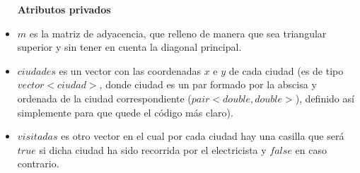 \documentclass[12pt]{article}
\begin{document}
\begin{itemize}
\item[\textbf{Atributos privados}]
\item $m$ es la matriz de adyacencia, que relleno de manera que sea triangular superior y sin tener en cuenta la diagonal principal.
\item $ciudades$ es un vector con las coordenadas $x$ e $y$ de cada ciudad (es de tipo $vector<ciudad>$, donde ciudad es un par formado por la abscisa y ordenada de la ciudad correspondiente ($pair<double, double>$), definido así simplemente para que quede el código más claro).
\item $visitadas$ es otro vector en el cual por cada ciudad hay una casilla que será $true$ si dicha ciudad ha sido recorrida por el electricista y $false$ en caso contrario.
\end{itemize}
\end{document}
